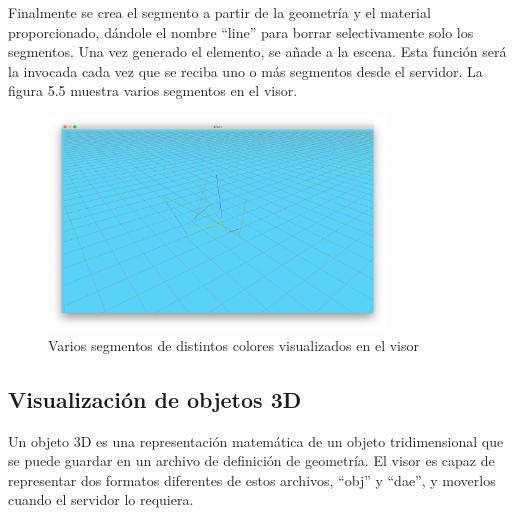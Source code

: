 Finalmente se crea el segmento a partir de la geometría y el material proporcionado, dándole el nombre ``line'' para borrar selectivamente solo los segmentos. Una vez generado el elemento, se añade a la escena. Esta función será la invocada cada vez que se reciba uno o más segmentos desde el servidor. La figura 5.5 muestra varios segmentos en el visor.
\begin{figure}[H]
  \begin{center}
    \includegraphics[width=0.8\textwidth]{figures/visualizarlineas.png}
		\caption{Varios segmentos de distintos colores visualizados en el visor}
		\label{fig.visualizarsegmentos}
		\end{center}
\end{figure}

\subsection{Visualización de objetos 3D}
Un objeto 3D es una representación matemática de un objeto tridimensional que se puede guardar en un archivo de definición de geometría. El visor es capaz de representar dos formatos diferentes de estos archivos, ``obj'' y ``dae'', y moverlos cuando el servidor lo requiera. 

